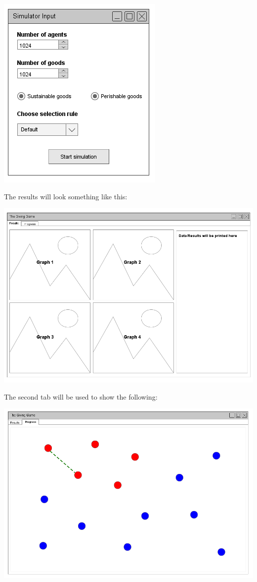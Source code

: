 \documentclass{article}
\begin{document}
\includegraphics[scale=0.70]{Inputexample}

The results will look something like this:

\includegraphics[scale=0.70]{Resultsexample}

The second tab will be used to show the following:

\includegraphics[scale=0.70]{Progressexample}
\end{document}
